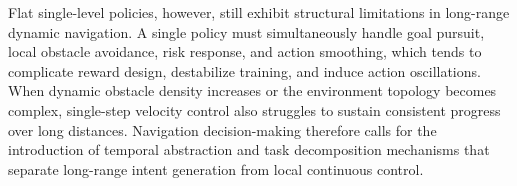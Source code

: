 Flat single-level policies, however, still exhibit structural limitations in long-range dynamic navigation. A single policy must simultaneously handle goal pursuit, local obstacle avoidance, risk response, and action smoothing, which tends to complicate reward design, destabilize training, and induce action oscillations. When dynamic obstacle density increases or the environment topology becomes complex, single-step velocity control also struggles to sustain consistent progress over long distances. Navigation decision-making therefore calls for the introduction of temporal abstraction and task decomposition mechanisms that separate long-range intent generation from local continuous control.





